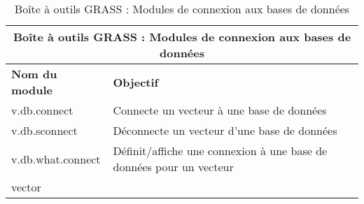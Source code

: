 \begin{table}[H]
\centering
 \begin{tabular}{|p{4cm}|p{10cm}|}
  \hline \multicolumn{2}{|c|}{\textbf{Boîte à outils GRASS : Modules de connexion aux bases de données}} \\
  \hline \textbf{Nom du module} & \textbf{Objectif} \\
  \hline v.db.connect & Connecte un vecteur à une base de données\\
  \hline v.db.sconnect & Déconnecte un vecteur d'une base de données\\
  \hline v.db.what.connect & Définit/affiche une connexion à une base de données pour un vecteur\\ vector \\
\hline
\end{tabular}
\caption{Boîte à outils GRASS : Modules de connexion aux bases de données}
\end{table}


